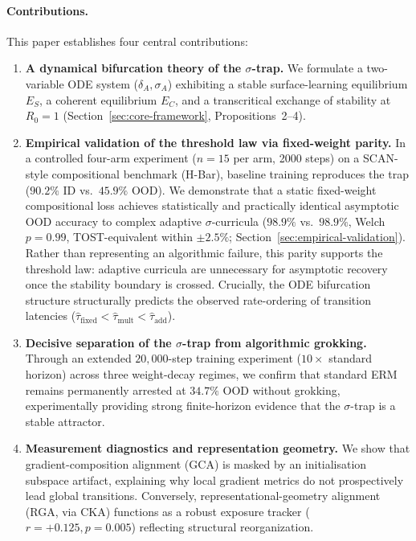 \documentclass{article}
\theoremstyle{definition}
\begin{document}
\paragraph*{Contributions.}
This paper establishes four central contributions:
\begin{enumerate}[nosep]
\item \textbf{A dynamical bifurcation theory of the $\sigma$-trap.}
  We formulate a two-variable ODE system ($\delta_A, \sigma_A$) exhibiting a stable surface-learning equilibrium $E_S$, a coherent equilibrium $E_C$, and a transcritical exchange of stability at $R_0 = 1$ (Section~\ref{sec:core-framework}, Propositions~2--4).
\item \textbf{Empirical validation of the threshold law via fixed-weight parity.}
  In a controlled four-arm experiment ($n = 15$ per arm, 2000 steps) on a SCAN-style compositional benchmark (H-Bar), baseline training reproduces the trap ($90.2\%$ ID vs.\ $45.9\%$ OOD). We demonstrate that a static fixed-weight compositional loss achieves statistically and practically identical asymptotic OOD accuracy to complex adaptive $\sigma$-curricula ($98.9\%$ vs.\ $98.9\%$, Welch $p = 0.99$, TOST-equivalent within $\pm 2.5\%$; Section~\ref{sec:empirical-validation}). Rather than representing an algorithmic failure, this parity supports the threshold law: adaptive curricula are unnecessary for asymptotic recovery once the stability boundary is crossed. Crucially, the ODE bifurcation structure structurally predicts the observed rate-ordering of transition latencies ($\hat{\tau}_{\text{fixed}} < \hat{\tau}_{\text{mult}} < \hat{\tau}_{\text{add}}$).
\item \textbf{Decisive separation of the $\sigma$-trap from algorithmic grokking.}
  Through an extended $20{,}000$-step training experiment ($10\times$ standard horizon) across three weight-decay regimes, we confirm that standard ERM remains permanently arrested at $34.7\%$ OOD without grokking, experimentally providing strong finite-horizon evidence that the $\sigma$-trap is a stable attractor.
\item \textbf{Measurement diagnostics and representation geometry.}
  We show that gradient-composition alignment (GCA) is masked by an initialisation subspace artifact, explaining why local gradient metrics do not prospectively lead global transitions. Conversely, representational-geometry alignment (RGA, via CKA) functions as a robust exposure tracker ($r = +0.125, p = 0.005$) reflecting structural reorganization.
\end{enumerate}
\end{document}
